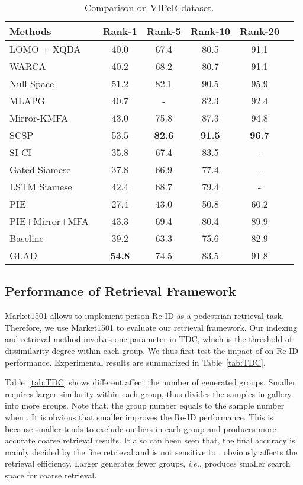 \documentclass[sigconf]{acmart}
\begin{document}
\begin{table}
\centering
\small
\caption{Comparison on VIPeR dataset.}
\begin{tabular}{lccccc}
\hline
 Methods            &Rank-1    &Rank-5    &Rank-10   &Rank-20 \\
\hline
LOMO + XQDA~\cite{LOMOXQAD} &40.0    &67.4    &80.5    &91.1\\
WARCA~\cite{WARCA} &40.2   &68.2   &80.7    &91.1\\
Null Space~\cite{LDNS}    &51.2    &82.1    &90.5    &95.9\\
MLAPG~\cite{MLAPG} &40.7 &-  &82.3 &92.4 \\
Mirror-KMFA\cite{MirrorKFDA} &43.0 &75.8 &87.3 &94.8\\
SCSP~\cite{scsp} &53.5 &{\bf82.6} &{\bf91.5} &{\bf96.7} \\
\hline
SI-CI~\cite{SICI}                 &35.8    &67.4    &83.5    &-\\
Gated Siamese~\cite{GatedSiamese}                &37.8    &66.9    &77.4 &-\\
LSTM Siamese~\cite{varior2016siamese}                &42.4    &68.7    &79.4    &-\\
PIE~\cite{zheng2017pose}                &27.4    &43.0    &50.8    &60.2\\
PIE+Mirror+MFA~\cite{zheng2017pose}                &43.3    &69.4    &80.4    &89.9\\
\hline
Baseline & 39.2  & 63.3 & 75.6  & 82.9 \\
GLAD      &{\bf54.8}&{74.5}&{83.5}&{91.8}\\
\hline
\end{tabular}
\label{tab:viper}
\end{table}





\subsection{Performance of Retrieval Framework}
\label{sec:E_RS}

Market1501 allows to implement person Re-ID as a pedestrian retrieval task. Therefore, we use Market1501 to evaluate our retrieval framework. Our indexing and retrieval method involves one parameter  in TDC, which is the threshold of dissimilarity degree within each group. We thus first test the impact of  on Re-ID performance. Experimental results are summarized in Table~\ref{tab:TDC}.

Table~\ref{tab:TDC} shows different  affect the number of generated groups. Smaller  requires larger similarity within each group, thus divides the samples in gallery into more groups. Note that, the group number equals to the sample number when . It is obvious that smaller  improves the Re-ID performance. This is because smaller  tends to exclude outliers in each group and produces more accurate coarse retrieval results. It also can been seen that, the final accuracy is mainly decided by the fine retrieval and is not sensitive to .  obviously affects the retrieval efficiency. Larger  generates fewer groups,\emph{ i.e.}, produces smaller search space for coarse retrieval.
\end{document}
